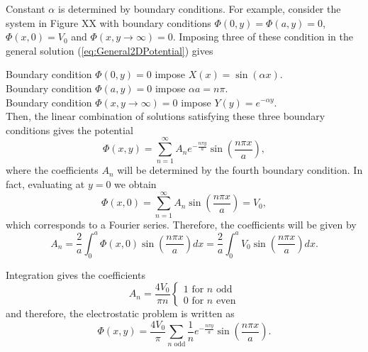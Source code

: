 Constant $\alpha$ is determined by boundary conditions. For example, consider the system in Figure XX with boundary conditions
$\Phi (0,y) = \Phi (a,y) = 0$, $\Phi (x,0) = V_0$ and $\Phi(x, y\rightarrow \infty) = 0$. Imposing  three of these condition in the general solution  (\ref{eq:General2DPotential}) gives

Boundary condition $\Phi (0,y)=0$ impose $X(x) = \sin (\alpha x)$. \\
Boundary condition $\Phi (a,y)=0$ impose $\alpha a = n \pi$. \\
Boundary condition $\Phi (x,y\rightarrow \infty)=0$ impose $Y(y) = e^{- \alpha y}$. \\

Then, the linear combination of solutions satisfying these three boundary conditions gives the potential
\begin{equation}
\Phi (x,y) = \sum_{n=1}^\infty A_n e^{-\frac{n\pi y}{a}} \sin \left( \frac{n\pi x}{a} \right),
\end{equation}
where the coefficients $A_n$ will be determined by the fourth boundary condition. In fact, evaluating at $y=0$ we obtain
\begin{equation}
\Phi (x,0) = \sum_{n=1}^\infty A_n  \sin \left( \frac{n\pi x}{a} \right) = V_0,
\end{equation}
which corresponds to a Fourier series. Therefore, the coefficients will be given by
\begin{equation}
A_n = \frac{2}{a} \int_0^a \Phi (x,0) \sin \left( \frac{n\pi x}{a} \right) dx = \frac{2}{a} \int_0^a V_0\sin \left( \frac{n\pi x}{a} \right) dx.
\end{equation}

Integration gives the coefficients
\begin{equation}
A_n = \frac{4V_0}{\pi n} 
\begin{cases}
1 \text{ for } n \text{ odd}\\
0 \text{ for } n \text{ even}
\end{cases}
\end{equation}
and therefore, the electrostatic problem is written as
\begin{equation}
\Phi (x,y) = \frac{4V_0}{\pi} \sum_{n \text{ odd}} \frac{1}{n}  e^{-\frac{n\pi y}{a}} \sin \left( \frac{n\pi x}{a} \right).
\end{equation}

